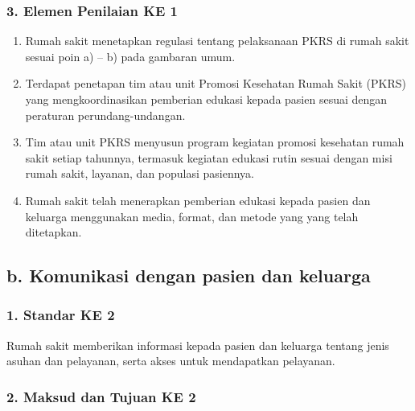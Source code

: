 \documentclass[
]{book}
\providecommand{\tightlist}{%
  \setlength{\itemsep}{0pt}\setlength{\parskip}{0pt}}
\begin{document}
\hypertarget{elemen-penilaian-ke-1}{%
\subsubsection*{3. Elemen Penilaian KE 1}\label{elemen-penilaian-ke-1}}

\begin{enumerate}
\def\labelenumi{\alph{enumi}.}
\tightlist
\item
  Rumah sakit menetapkan regulasi tentang pelaksanaan PKRS di rumah sakit sesuai poin a) -- b) pada gambaran umum.
\item
  Terdapat penetapan tim atau unit Promosi Kesehatan Rumah Sakit (PKRS) yang mengkoordinasikan pemberian edukasi kepada pasien sesuai dengan peraturan perundang-undangan.
\item
  Tim atau unit PKRS menyusun program kegiatan promosi kesehatan rumah sakit setiap tahunnya, termasuk kegiatan edukasi rutin sesuai dengan misi rumah sakit, layanan, dan populasi pasiennya.
\item
  Rumah sakit telah menerapkan pemberian edukasi kepada pasien dan keluarga menggunakan media, format, dan metode yang yang telah ditetapkan.
\end{enumerate}

\hypertarget{b.-komunikasi-dengan-pasien-dan-keluarga}{%
\subsection*{b. Komunikasi dengan pasien dan keluarga}\label{b.-komunikasi-dengan-pasien-dan-keluarga}}

\hypertarget{standar-ke-2}{%
\subsubsection*{1. Standar KE 2}\label{standar-ke-2}}

Rumah sakit memberikan informasi kepada pasien dan keluarga tentang jenis asuhan dan pelayanan, serta akses untuk mendapatkan pelayanan.

\hypertarget{maksud-dan-tujuan-ke-2}{%
\subsubsection*{2. Maksud dan Tujuan KE 2}\label{maksud-dan-tujuan-ke-2}}
\end{document}
